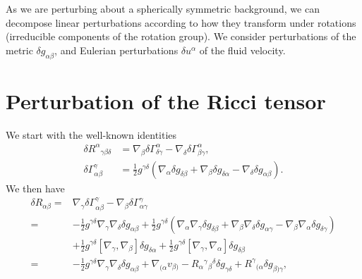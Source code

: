 \documentclass[12pt]{report}
\begin{document}
As we are perturbing about a spherically symmetric background,
we can decompose linear perturbations according to how they transform
under rotations (irreducible components of the rotation group).
We consider perturbations of the metric $\delta g_{\alpha\beta}$, 
and Eulerian perturbations $\delta u^{\alpha}$ of the fluid velocity.

\section{Perturbation of the Ricci tensor\label{eq:pert_ricci_tensor}}
We start with the well-known identities \cite{Wald:1984rg} 
\begin{align}
    \label{eq:general_pert_riemann_tensor}
    \delta R^{\alpha}{}_{\gamma\beta\delta}
    &=
    \nabla_{\beta}\delta\Gamma^{\alpha}_{\delta\gamma}
    -
    \nabla_{\delta}\delta\Gamma^{\alpha}_{\beta\gamma}
    ,\\
    \label{eq:general_pert_christoffel_symbol}
    \delta \Gamma^{\gamma}_{\alpha\beta}
    &=
    \frac{1}{2}g^{\gamma\delta}
    \left(
        \nabla_{\alpha}\delta g_{\delta\beta}
        +
        \nabla_{\beta}\delta g_{\delta\alpha}
        -
        \nabla_{\delta}\delta g_{\alpha\beta}
    \right)
    .
\end{align}
We then have
\begin{align}
    \delta R_{\alpha\beta}
    =&
    \nabla_{\gamma}\delta\Gamma^{\gamma}_{\alpha\beta}
    -
    \nabla_{\beta}\delta\Gamma^{\gamma}_{\alpha\gamma}
    \nonumber\\
    =&
    -
    \frac{1}{2}g^{\gamma\delta}
    \nabla_{\gamma}\nabla_{\delta}\delta g_{\alpha\beta}
    +
    \frac{1}{2}g^{\gamma\delta}
    \left(
        \nabla_{\alpha}\nabla_{\gamma}\delta g_{\delta\beta}
        +
        \nabla_{\beta}\nabla_{\delta}\delta g_{\alpha\gamma}
        -
        \nabla_{\beta}\nabla_{\alpha}\delta g_{\delta\gamma}
    \right)
    \nonumber\\
    &
    +
    \frac{1}{2}g^{\gamma\delta}
    \left[\nabla_{\gamma},\nabla_{\beta}\right]\delta g_{\delta\alpha}
    +
    \frac{1}{2}g^{\gamma\delta}
    \left[\nabla_{\gamma},\nabla_{\alpha}\right]\delta g_{\delta\beta}
    \nonumber\\
    =&
    -
    \frac{1}{2}g^{\gamma\delta}
    \nabla_{\gamma}\nabla_{\delta}\delta g_{\alpha\beta}
    +
    \nabla_{(\alpha}v_{\beta)}
    -
    R_{\alpha}{}^{\gamma}{}_{\beta}{}^{\delta}\delta g_{\gamma\delta}
    +
    R^{\gamma}{}_{(\alpha}\delta g_{\beta)\gamma}
    ,
\end{align}
\end{document}
